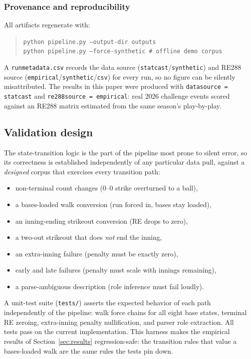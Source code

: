 \subsubsection{Provenance and reproducibility}
All artifacts regenerate with:
\begin{quote}
\texttt{python pipeline.py --output-dir outputs}\\
\texttt{python pipeline.py --force-synthetic  \# offline demo corpus}
\end{quote}
A \texttt{run\crvus{}metadata.csv} records the data source
(\texttt{statcast}\slash\texttt{synthetic}) and RE288 source
(\texttt{empirical}\slash\texttt{synthetic}\slash\texttt{csv}) for every run, so
no figure can be silently misattributed. The results in this paper were
produced with \texttt{data\crvus{}source = statcast} and
\texttt{re288\crvus{}source = empirical}: real 2026 challenge events scored
against an RE288 matrix estimated from the same season's play-by-play.

\subsection{Validation design}
\label{sec:validation}
The state-transition logic is the part of the pipeline most prone to silent
error, so its correctness is established independently of any particular data
pull, against a \emph{designed} corpus that exercises every transition path:

\begin{itemize}
  \item non-terminal count changes (0--0 strike overturned to a ball),
  \item a bases-loaded walk conversion (run forced in, bases stay loaded),
  \item an inning-ending strikeout conversion (RE drops to zero),
  \item a two-out strikeout that does \emph{not} end the inning,
  \item an extra-inning failure (penalty must be exactly zero),
  \item early and late failures (penalty must scale with innings remaining),
  \item a parse-ambiguous description (role inference must fail loudly).
\end{itemize}

A unit-test suite (\texttt{tests/}) asserts the expected behavior of each path
independently of the pipeline: walk force chains for all eight base states,
terminal RE zeroing, extra-inning penalty nullification, and parser role
extraction. All tests pass on the current implementation. This harness makes the
empirical results of Section~\ref{sec:results} regression-safe: the transition
rules that value a bases-loaded walk are the same rules the tests pin down.

